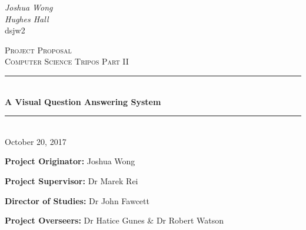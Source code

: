 \documentclass[12pt,a4paper,twoside]{article}
\begin{document}

\begin{titlepage} %
	
	\begin{flushright}
		\emph{Joshua Wong}\\
		\emph{Hughes Hall}\\
		dsjw2\\
	\end{flushright}
	
	\vspace{15mm}
	
	\newcommand{\HRule}{\rule{\linewidth}{0.5mm}} %

	\begin{center}
	
	\textsc{\LARGE Project Proposal}\\[1.0cm] 
	\textsc{\LARGE Computer Science Tripos Part II}\\[1.0cm] 
	
	
	
	\HRule\\[0.5cm]
	
	{\huge\bfseries A Visual Question Answering System}\\[0.4cm] %
	
	\HRule\\[0.4cm]
	 {\large October 20, 2017}
	\end{center}
	
\vspace{20mm}
\textbf{Project Originator:}  Joshua Wong
\vspace{15mm}

\textbf{Project Supervisor:} Dr Marek Rei
\vspace{15mm}

\textbf{Director of Studies:} Dr John Fawcett
\vspace{15mm}

\textbf{Project Overseers:} Dr  Hatice Gunes \& Dr Robert Watson
		
\end{titlepage}
\end{document}
